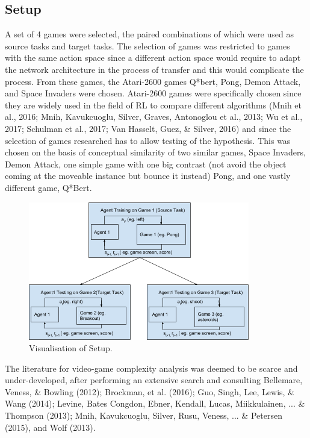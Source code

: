 \subsection*{Setup}
A set of 4 games were selected, the paired combinations of which were used as source tasks and target tasks. The selection of games was restricted to games with the same action space since a different action space would require to adapt the network architecture in the process of transfer and this would complicate the process. From these games, the Atari-2600 games Q*bert, Pong, Demon Attack, and Space Invaders were chosen. Atari-2600 games were specifically chosen since they are widely used in the field of RL to compare different algorithms (Mnih et al., 2016; Mnih, Kavukcuoglu, Silver, Graves, Antonoglou et al., 2013; Wu et al., 2017; Schulman et al., 2017; Van Hasselt, Guez, \& Silver, 2016) and since the selection of games researched has to allow testing of the hypothesis. This was chosen on the basis of conceptual similarity of two similar games, Space Invaders, Demon Attack, one simple game with one big contrast (not avoid the object coming at the moveable instance but bounce it instead) Pong, and one vastly different game, Q*Bert. 
\begin{figure}[t]
	\includegraphics[width=\columnwidth]{fig4.png} 
	\caption{Visualisation of Setup.}
\end{figure}
The literature for video-game complexity analysis was deemed to be scarce and under-developed, after performing an extensive search and consulting Bellemare, Veness, \& Bowling (2012); Brockman, et al. (2016); Guo, Singh, Lee, Lewis, \& Wang (2014); Levine, Bates Congdon, Ebner, Kendall, Lucas, Miikkulainen, ... \& Thompson (2013); Mnih, Kavukcuoglu, Silver, Rusu, Veness, ... \& Petersen (2015), and Wolf (2013). 


